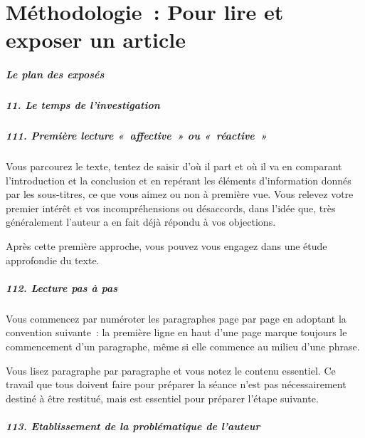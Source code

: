 \chapter{Méthodologie~: Pour lire et exposer un article}

\paragraph{Le plan des exposés}

\paragraph{11. Le temps de l'investigation}

\paragraph{111. Première lecture «~affective~» ou «~réactive~»}

Vous parcourez le texte, tentez de saisir d'où il part et où il va en
comparant l'introduction et la conclusion et en repérant les éléments
d'information donnés par les sous-titres, ce que vous aimez ou non à
première vue. Vous relevez votre premier intérêt et vos incompréhensions
ou désaccords, dans l'idée que, très généralement l'auteur a en fait
déjà répondu à vos objections.

Après cette première approche, vous pouvez vous engagez dans une étude
approfondie du texte.

\paragraph{112. Lecture pas à pas}

Vous commencez par numéroter les paragraphes page par page en adoptant
la convention suivante~: la première ligne en haut d'une page marque
toujours le commencement d'un paragraphe, même si elle commence au
milieu d'une phrase.

Vous lisez paragraphe par paragraphe et vous notez le contenu essentiel.
Ce travail que tous doivent faire pour préparer la séance n'est pas
nécessairement destiné à être restitué, mais est essentiel pour préparer
l'étape suivante.

\paragraph{113. Etablissement de la problématique de l'auteur}

